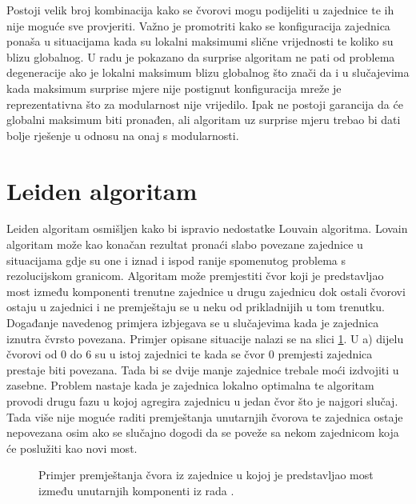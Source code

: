 \documentclass[times, utf8, diplomski]{fer}
\begin{document}
Postoji velik broj kombinacija kako se čvorovi mogu podijeliti u zajednice te ih nije moguće sve provjeriti. Važno je promotriti kako se konfiguracija zajednica ponaša u situacijama kada su lokalni maksimumi slične vrijednosti te koliko su blizu globalnog. U radu \cite{gamermann2022algorithm} je pokazano da surprise algoritam ne pati od problema degeneracije ako je lokalni maksimum blizu globalnog što znači da i u slučajevima kada maksimum surprise mjere nije postignut konfiguracija mreže je reprezentativna što za modularnost nije vrijedilo. Ipak ne postoji garancija da će globalni maksimum biti pronađen, ali algoritam uz surprise mjeru trebao bi dati bolje rješenje u odnosu na onaj s modularnosti.



\section{Leiden algoritam}

Leiden algoritam osmišljen kako bi ispravio nedostatke Louvain algoritma. Lovain algoritam može kao konačan rezultat pronaći slabo povezane zajednice u situacijama gdje su one i iznad i ispod ranije spomenutog problema s rezolucijskom granicom. Algoritam može premjestiti čvor koji je predstavljao most između komponenti trenutne zajednice u drugu zajednicu dok ostali čvorovi ostaju u zajednici i ne premještaju se u neku od prikladnijih u tom trenutku. Događanje navedenog primjera izbjegava se u slučajevima kada je zajednica iznutra čvrsto povezana. Primjer opisane situacije nalazi se na slici \ref{fig:bridge-node}. U a) dijelu čvorovi od 0 do 6 su u istoj zajednici te kada se čvor 0 premjesti zajednica prestaje biti povezana. Tada bi se dvije manje zajednice trebale moći izdvojiti u zasebne. Problem nastaje kada je zajednica lokalno optimalna te algoritam provodi drugu fazu u kojoj agregira zajednicu u jedan čvor što je najgori slučaj. Tada više nije moguće raditi premještanja unutarnjih čvorova te zajednica ostaje nepovezana osim ako se slučajno dogodi da se poveže sa nekom zajednicom koja će poslužiti kao novi most.

\begin{figure}
	\caption{Primjer premještanja čvora iz zajednice u kojoj je predstavljao most između unutarnjih komponenti iz rada \cite{traag2019louvain}.}
	\label{fig:bridge-node}
\end{figure}
\end{document}
